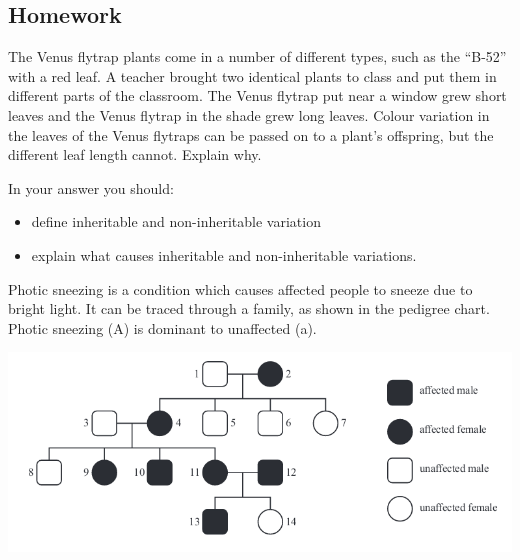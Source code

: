 \documentclass{exam}
\begin{document}
\subsection*{Homework}
\begin{questions}
  \question {[NZQA 2016]} The Venus flytrap plants come in a number of different types, such as the “B-52” with a red leaf. A teacher brought
            two identical plants to class and put them in different parts of the classroom. The Venus flytrap put near a window grew short leaves and
            the Venus flytrap in the shade grew long leaves. Colour variation in the leaves of the Venus flytraps can be passed on to a plant’s
            offspring, but the different leaf length cannot. Explain why.
            
            In your answer you should:
            \begin{itemize}
              \item define inheritable and non-inheritable variation
              \item explain what causes inheritable and non-inheritable variations.
            \end{itemize}
  \question {[NZQA 2016]} Photic sneezing is a condition which causes affected people to sneeze due to bright light. It can be traced
            through a family, as shown in the pedigree chart. Photic sneezing (A) is dominant to unaffected (a).
            
            \includegraphics[width=\textwidth]{sneeze}
            
            
\end{questions}
\end{document}
